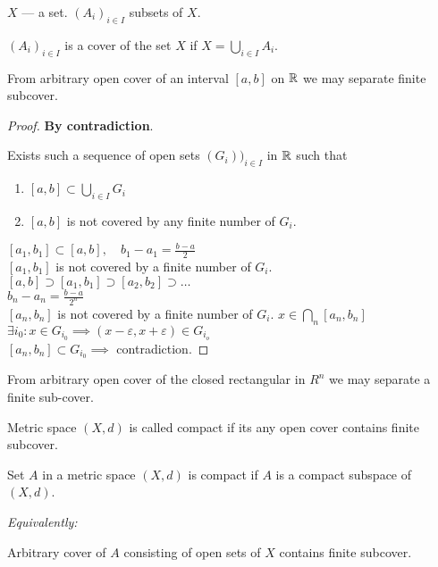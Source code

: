 
$X$ --- a set. $(A_i)_{i \in  I}$ subsets of $X$.


\begin{definition}
  $(A_i)_{i \in  I}$ is a cover of the set $X$ if $X = \bigcup_{i \in  I} A_i$.
\end{definition}

\begin{lemma}
  From arbitrary open cover of an interval $[a,b]$ on $\mathbb{R}$ we may separate finite subcover.
\end{lemma}

\begin{proof}
  \textbf{By contradiction}.

  Exists such a sequence of open sets $(G_i))_{i \in I}$ in $\mathbb{R}$ such that
  \begin{enumerate}
    \item $[a,b] \subset \bigcup_{i \in  I} G_i$ 
    \item $[a,b]$ is not covered by any finite number of $G_i$.
  \end{enumerate}

  $[a_1, b_1] \subset [a,b], \quad b_1 - a_1 = \frac{b-a}{2}$\\
  $[a_1,b_1]$ is not covered by a finite number of $G_i$.\\
  $[a,b] \supset [a_1,b_1] \supset [a_2,b_2] \supset \ldots$\\
  $b_n - a_n = \frac{b-a}{2^{n}}$ \\
  $[a_{n}, b_{n}]$ is not covered by a finite number of $G_i$.
  $x \in  \bigcap_{n} [a_n, b_n]$\\
  $\exists i_0 : x \in G_{i_{0}} \implies (x-\varepsilon, x+\varepsilon) \in  G_{i_o}$ \\
  $[a_n,b_n] \subset G_{i_0} \implies$ contradiction.
\end{proof}

\begin{exercise}
  From arbitrary open cover of the closed rectangular in $R^{n}$ we may separate
  a finite sub-cover.
\end{exercise}

\begin{definition}
  Metric space  $(X,d)$ is called compact if its any open cover
  contains finite subcover.
\end{definition}

\begin{definition}
  Set $A$ in a metric space $(X,d)$ is compact if $A$ is a compact subspace of $(X,d)$.

  \textit{Equivalently:}

  Arbitrary cover of $A$ consisting of open sets of $X$ contains finite subcover.
\end{definition}

